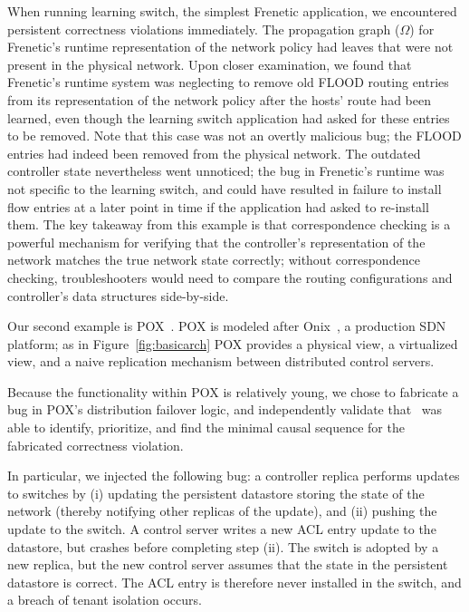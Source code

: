 {When running learning switch, the simplest Frenetic application, we encountered
persistent correctness violations immediately. The propagation graph ($\Omega$) for Frenetic's
runtime representation of the network policy had leaves that were not present
in the physical network. Upon closer examination, we found that Frenetic's
runtime system was neglecting to remove old FLOOD routing entries from its
representation of the network policy after the hosts' route had been learned,
even though the learning switch application had
asked for these entries to be removed. Note that this case was not an overtly
malicious bug; the FLOOD entries had indeed been removed from the physical
network. The outdated controller state nevertheless went unnoticed; the bug in
Frenetic's runtime was not specific to the learning switch, and could have
resulted in failure to install flow entries at a later point in time if the
application had asked to re-install them. The key takeaway from this example
is that correspondence checking is a powerful mechanism for
verifying that the controller's representation of the network matches the true
network state correctly; without correspondence checking, troubleshooters
would need to compare the routing configurations and controller's data
structures side-by-side.

 Our second example is POX~\cite{pox}. POX is modeled after
Onix~\cite{onix}, a production SDN platform; as in Figure~\ref{fig:basicarch}
POX provides a physical view, a virtualized view, and a naive replication
mechanism between distributed control servers.

Because the functionality within POX is relatively young, we chose to
fabricate a bug in POX's distribution failover logic, and independently
validate that \projectname~was able to identify, prioritize, and find the
minimal causal sequence for the fabricated correctness violation.

In particular, we injected the following bug: a controller replica performs
updates to switches by (i) updating the persistent datastore storing the state
of the network (thereby notifying other replicas of the update), and (ii) pushing the
update to the switch. A control server writes a new ACL entry update to the datastore, but crashes
before completing step (ii). The switch is adopted by a new replica,
but the new control server assumes that the state in the persistent datastore
is correct. The ACL entry is therefore never installed in the switch, and a
breach of tenant isolation occurs.

}
